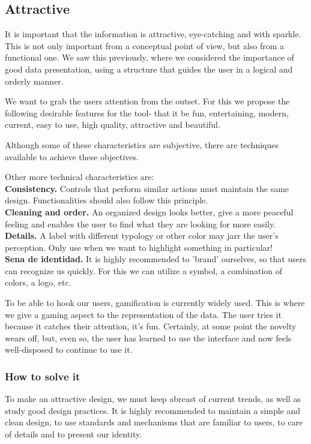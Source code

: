 \subsection{Attractive}
It is important that the information is attractive, eye-catching and with sparkle. This is not only important from a conceptual point of view, but also from a functional one. We saw this previously, where we considered the importance
of good data presentation, using a structure that guides the user in a logical and orderly manner.

We want to grab the users attention from the outset. For this we propose the following desirable features for the tool- that it be fun, entertaining,
modern, current, easy to use, high quality, attractive and beautiful.

Although some of these characteristics are subjective, there are techniques available to achieve these objectives.

Other more technical characteristics are: \\

\textbf{Consistency.} Controls that perform similar actions must maintain the same design. Functionalities
should also follow this principle. \\

\textbf{Cleaning and order.} An organized design looks better, give a more peaceful feeling and enables the user to find what they are looking for
more easily.\\

\textbf{Details.} A label with different typology or other color may jarr the user's perception. Only use when
we want to highlight something in particular! \\

\textbf{Sena de identidad.} It is highly recommended to 'brand' ourselves, so that users can recognize us quickly. For this we can utilize a symbol, a combination of colors, a logo, etc.

To be able to hook our users, gamification is currently widely used. This is where we give a gaming aspect to the representation of the data. The user tries it because it catches their attention, it's fun.
Certainly, at some point the novelty wears off, but, even so, the user has learned to use the interface and now feels well-disposed to continue to use it.

\subsubsection{How to solve it} 
To make an attractive design, we must keep abreast of current trends, as well as study good design practices.
It is highly recommended to maintain a simple and clean design, to use standards and mechanisms that are familiar to users,
to care of details and to present our identity.

